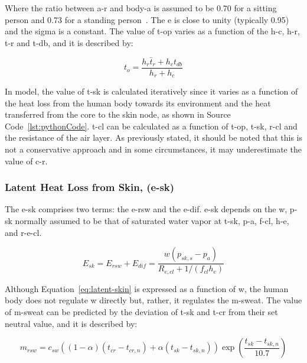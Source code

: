 Where the ratio between \ac{a-r} and \ac{body-a} is assumed to be 0.70 for a sitting person and 0.73 for a standing person~\cite{Fanger1967}.
The \ac{e} is close to unity (typically 0.95) and the \ac{sigma} is a constant.
The value of \ac{t-op} varies as a function of the \ac{h-c}, \ac{h-r}, \ac{t-r} and \ac{t-db}, and it is described by:

\begin{equation}
    t_{o}=\frac{h_{r} \bar{t}_{r}+h_{c} t_{db}}{h_{r}+h_{c}}\label{eq:t-op}
\end{equation}

In  model, the value of \ac{t-sk} is calculated iteratively since it varies as a function of the heat loss from the human body towards its environment and the heat transferred from the core to the skin node, as shown in Source Code~\ref{lst:pythonCode}.
\Ac{t-cl} can be calculated as a function of \ac{t-op}, \ac{t-sk}, \ac{r-cl} and the resistance of the air layer.
As previously stated, it should be noted that this is not a conservative approach and in some circumstances, it may underestimate the value of \ac{c-r}.

\subsubsection{Latent Heat Loss from Skin, (\acs{e-sk})}

The \acf{e-sk} comprises two terms: the \ac{e-rsw} and the \ac{e-dif}.
\ac{e-sk} depends on the \ac{w}, \ac{p-sk} normally assumed to be that of saturated water vapor at \ac{t-sk}, \ac{p-a}, \ac{f-cl}, \ac{h-e}, and \ac{r-e-cl}.

\begin{equation}
    E_{s k}=E_{rsw}+E_{dif}=\frac{w\left(p_{s k, s}-p_{a}\right)}{R_{e, c l}+1 /\left(f_{c l} h_{e}\right)}\label{eq:latent-skin}
\end{equation}

Although Equation~\ref{eq:latent-skin} is expressed as a function of \ac{w}, the human body does not regulate \ac{w} directly but, rather, it regulates the \ac{m-sweat}.
The value of \ac{m-sweat} can be predicted by the deviation of \ac{t-sk} and \ac{t-cr} from their set neutral value, and it is described by:

\begin{equation}
    m_{rsw}=c_{sw}((1 - \alpha) (t_{cr} - t_{cr,n}) + \alpha (t_{sk} - t_{sk,n})) \exp (\frac{t_{sk}-t_{sk,n}}{10.7})\label{eq:regulatory-sweating}
\end{equation}

